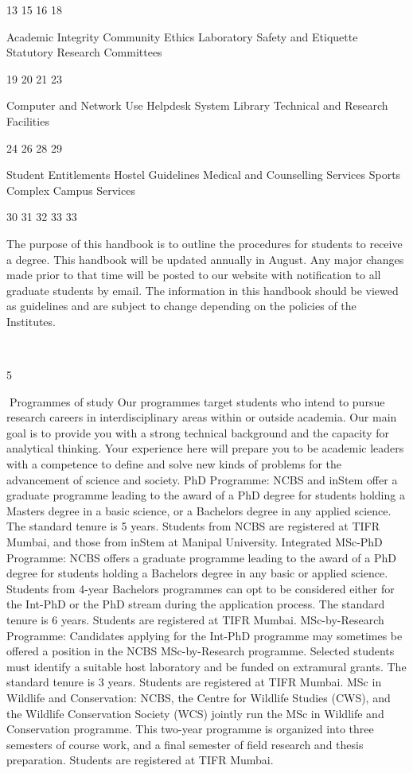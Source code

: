 \documentclass[a4paper,10pt]{article}
\begin{document}
13
15
16
18

Academic Integrity
Community Ethics
Laboratory Safety and Etiquette
Statutory Research Committees

19
20
21
23

Computer and Network Use
Helpdesk System
Library
Technical and Research Facilities

24
26
28
29

Student Entitlements
Hostel Guidelines
Medical and Counselling Services
Sports Complex
Campus Services

30
31
32
33
33

The purpose of this handbook is to outline the procedures for students to receive a degree.
This handbook will be updated annually in August. Any major changes made prior to that
time will be posted to our website with notification to all graduate students by email. The
information in this handbook should be viewed as guidelines and are subject to change
depending on the policies of the Institutes.

	
  

5	
  

Programmes of study
Our programmes target students who intend to pursue research careers in interdisciplinary
areas within or outside academia. Our main goal is to provide you with a strong technical
background and the capacity for analytical thinking. Your experience here will prepare you
to be academic leaders with a competence to define and solve new kinds of problems for the
advancement of science and society.
PhD Programme: NCBS and inStem offer a graduate programme leading to the award of a
PhD degree for students holding a Masters degree in a basic science, or a Bachelors degree
in any applied science. The standard tenure is 5 years. Students from NCBS are registered at
TIFR Mumbai, and those from inStem at Manipal University.
Integrated MSc-PhD Programme: NCBS offers a graduate programme leading to the
award of a PhD degree for students holding a Bachelors degree in any basic or applied
science. Students from 4-year Bachelors programmes can opt to be considered either for the
Int-PhD or the PhD stream during the application process. The standard tenure is 6 years.
Students are registered at TIFR Mumbai.
MSc-by-Research Programme: Candidates applying for the Int-PhD programme may
sometimes be offered a position in the NCBS MSc-by-Research programme. Selected
students must identify a suitable host laboratory and be funded on extramural grants. The
standard tenure is 3 years. Students are registered at TIFR Mumbai.
MSc in Wildlife and Conservation: NCBS, the Centre for Wildlife Studies (CWS), and the
Wildlife Conservation Society (WCS) jointly run the MSc in Wildlife and Conservation
programme. This two-year programme is organized into three semesters of course work, and
a final semester of field research and thesis preparation. Students are registered at TIFR
Mumbai.
\end{document}

